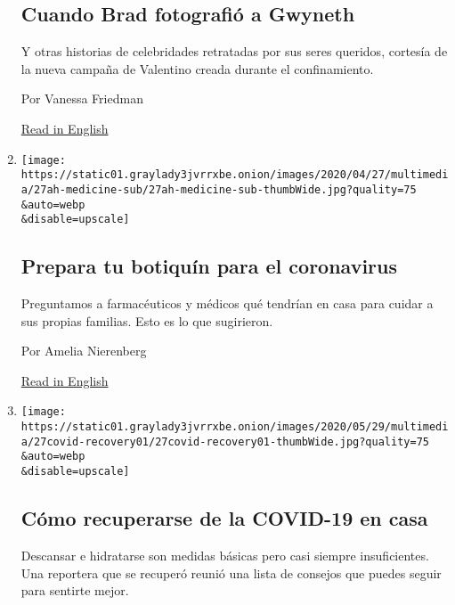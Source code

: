 \begin{enumerate}
  \hypertarget{cuando-brad-fotografiuxf3-a-gwyneth}{%
  \subsection{Cuando Brad fotografió a
  Gwyneth}\label{cuando-brad-fotografiuxf3-a-gwyneth}}

  Y otras historias de celebridades retratadas por sus seres queridos,
  cortesía de la nueva campaña de Valentino creada durante el
  confinamiento.

  Por Vanessa Friedman

  \href{https://www.nytimes3xbfgragh.onion/2020/07/22/style/gwyneth-paltrow-valentino-ad-campaign.html}{Read
  in English}
\item
  \href{/es/2020/07/14/espanol/estilos-de-vida/botiquin-medicina-coronavirus.html}{}

  \texttt{[image: https://static01.graylady3jvrrxbe.onion/images/2020/04/27/multimedia/27ah-medicine-sub/27ah-medicine-sub-thumbWide.jpg?quality=75\\\&auto=webp\\\&disable=upscale]}

  \hypertarget{prepara-tu-botiquuxedn-para-el-coronavirus}{%
  \subsection{Prepara tu botiquín para el
  coronavirus}\label{prepara-tu-botiquuxedn-para-el-coronavirus}}

  Preguntamos a farmacéuticos y médicos qué tendrían en casa para cuidar
  a sus propias familias. Esto es lo que sugirieron.

  Por Amelia Nierenberg

  \href{https://www.nytimes3xbfgragh.onion/2020/04/24/health/coronavirus-medicine-cabinet.html}{Read
  in English}
\item
  \href{/es/2020/07/13/espanol/estilos-de-vida/como-recuperarse-coronavirus.html}{}

  \texttt{[image: https://static01.graylady3jvrrxbe.onion/images/2020/05/29/multimedia/27covid-recovery01/27covid-recovery01-thumbWide.jpg?quality=75\\\&auto=webp\\\&disable=upscale]}

  \hypertarget{cuxf3mo-recuperarse-de-la-covid-19-en-casa}{%
  \subsection{Cómo recuperarse de la COVID-19 en
  casa}\label{cuxf3mo-recuperarse-de-la-covid-19-en-casa}}

  Descansar e hidratarse son medidas básicas pero casi siempre
  insuficientes. Una reportera que se recuperó reunió una lista de
  consejos que puedes seguir para sentirte mejor.


\end{enumerate}
